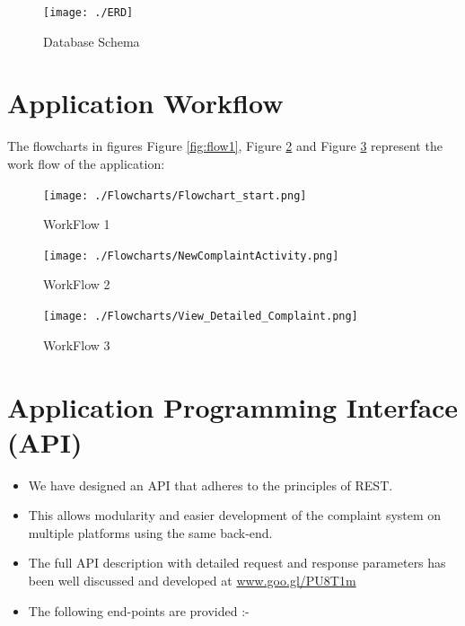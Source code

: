 \documentclass[12pt]{article}
\begin{document}
\begin{figure}[H]
\centering
\texttt{[image: ./ERD]}
\caption{Database Schema}
\label{fig:dbSchema}
\end{figure}

\newpage

\section{Application Workflow}
The flowcharts in figures Figure \ref{fig:flow1}, Figure \ref{fig:flow2} and Figure \ref{fig:flow3} represent the work flow of the application:

     \begin{figure}[!ht]
      \begin{minipage}{.5\textwidth}
        \centering
       \texttt{[image: ./Flowcharts/Flowchart\_start.png]}
      \caption{WorkFlow 1} \label{fig:flow1}
    \end{minipage}
      \begin{minipage}{.5\textwidth}
        \centering
    \texttt{[image: ./Flowcharts/NewComplaintActivity.png]}
      \caption{WorkFlow 2} \label{fig:flow2}
    \end{minipage}
    \end{figure}

\begin{figure}[H]
  \centering
  \texttt{[image: ./Flowcharts/View\_Detailed\_Complaint.png]}
    \caption{WorkFlow 3} \label{fig:flow3}
\end{figure}




\section{Application Programming Interface (API)}
\begin{itemize}
\setlength\itemsep{-0.4em}
\item We have designed an API that adheres to the principles of REST.
\item This allows modularity and easier development of the complaint system on multiple platforms using the same back-end.
\item The full API description with detailed request and response parameters has been well discussed and developed at \url{www.goo.gl/PU8T1m}

\item The following end-points are provided :-
\end{itemize}
\end{document}
